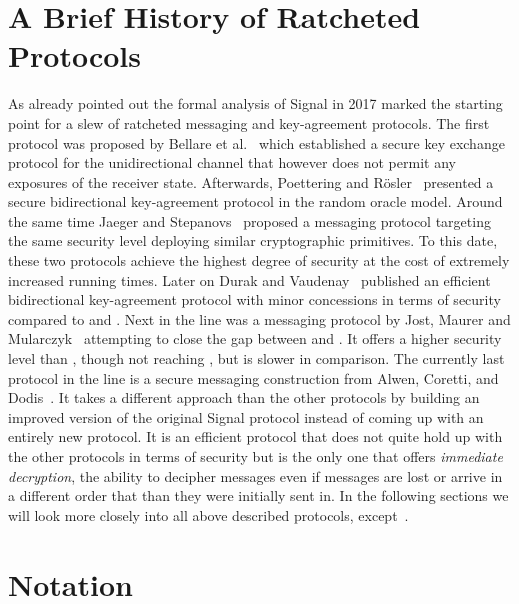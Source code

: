 \documentclass[11pt,a4paper,twoside,openright,bibliography=totoc]{scrbook}
\begin{document}
\section{A Brief History of Ratcheted Protocols}
\label{sec:brief-hist-ratch}

As already pointed out the formal analysis of Signal in 2017 marked the
starting point for a slew of ratcheted messaging and key-agreement
protocols. The first protocol was proposed by Bellare et
al.~\cite{bellare2017ratcheted} which established a secure key
exchange protocol for the unidirectional channel that however does not
permit any exposures of the receiver state. Afterwards, Poettering and
Rösler~\cite{poettering2018towards} presented a secure bidirectional
key-agreement protocol in the random oracle model. Around the same
time Jaeger and Stepanovs~\cite{jaeger2018optimal} proposed a
messaging protocol targeting the same security level deploying
similar cryptographic primitives. To this date, these two protocols achieve the
highest degree of security at the cost of extremely increased running
times. Later on Durak and Vaudenay~\cite{durak2018bidirectional}
published an efficient bidirectional key-agreement protocol with minor
concessions in terms of security compared to
\cite{poettering2018towards} and \cite{jaeger2018optimal}. Next in
the line was a messaging protocol by Jost, Maurer and
Mularczyk~\cite{jostefficient} attempting to close the gap between
\cite{durak2018bidirectional} and
\cite{poettering2018towards,jaeger2018optimal}. It offers a higher
security level than \cite{durak2018bidirectional}, though not reaching
\cite{poettering2018towards,jaeger2018optimal}, but is slower in
comparison. The currently last protocol in the line is a secure messaging construction
from Alwen, Coretti, and Dodis~\cite{alwen2018double}. It takes
a different approach than the other protocols by building an
improved version of the original Signal protocol instead of
coming up with an entirely new protocol. It is an efficient protocol
that does not quite hold up with the other protocols in terms of
security but is the only one that offers \textit{immediate decryption},
the ability to decipher messages even if messages are lost or arrive in
a different order that than they were initially sent in.
In the following sections we will look more closely into all
above described protocols, except~\cite{bellare2017ratcheted}.

\section{Notation}
\label{sec:notation}
\end{document}
